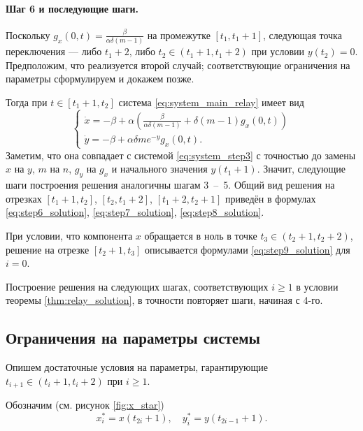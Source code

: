 \paragraph{Шаг 6 и последующие шаги.} Поскольку $g_x(0, t) = \frac{\beta}{\alpha \delta (m - 1)}$ на промежутке $[t_1, t_1 + 1]$, следующая точка переключения --- либо $t_1 + 2$, либо $t_2 \in (t_1 + 1, t_1 + 2)$ при условии $y(t_2) = 0$. Предположим, что реализуется второй случай; соответствующие ограничения на параметры сформулируем и докажем позже.

Тогда при $t \in [t_1 + 1, t_2]$ система \eqref{eq:system_main_relay} имеет вид
%
\begin{equation}
	\label{eq:step6_system}
	\begin{cases}
		\dot{x} = -\beta + \alpha \left(\frac{\beta}{\alpha \delta (m - 1)} + \delta (m - 1) g_x(0, t)\right)\\
		\dot{y} = -\beta + \alpha \delta m e^{-y} g_x(0, t).
	\end{cases}
\end{equation}
%
Заметим, что она совпадает с системой \eqref{eq:system_step3} с точностью до замены $x$ на $y$, $m$ на $n$, $g_y$ на $g_x$ и начального значения $y(t_1 + 1)$. Значит, следующие шаги построения решения аналогичны шагам 3~--~5. Общий вид решения на отрезках $[t_1 + 1, t_2]$, $[t_2, t_1 + 2]$, $[t_1 + 2, t_2 + 1]$ приведён в формулах \eqref{eq:step6_solution}, \eqref{eq:step7_solution},  \eqref{eq:step8_solution}.

При условии, что компонента $x$ обращается в ноль в точке $t_3 \in (t_2 + 1, t_2 + 2)$, решение на отрезке $[t_2 + 1, t_3]$ описывается формулами \eqref{eq:step9_solution} для $i = 0$.

Построение решения на следующих шагах, соответствующих $i \geqslant 1$ в условии теоремы \ref{thm:relay_solution}, в точности повторяет шаги, начиная с 4-го.

\subsection{Ограничения на параметры системы}
Опишем достаточные условия на параметры, гарантирующие $t_{i + 1} \in (t_i + 1, t_i + 2)$ при $i \geqslant 1$.

Обозначим (см. рисунок \ref{fig:x_star})
\begin{equation}
	\label{eq:x_star_definition}
	x^*_i = x(t_{2i} + 1), \quad y^*_i = y(t_{2i - 1} + 1).
\end{equation}

